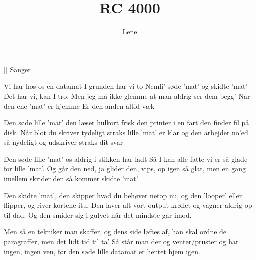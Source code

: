 \documentclass[a4paper,11pt]{article}
\title{RC 4000}
\author{Lene}
\begin{document}
\maketitle

\begin{roles}
[] Sanger
\end{roles}

\begin{song}
Vi har hos os en datamat
I grunden har vi to
Nemli' søde 'mat' og skidte 'mat'
Det har vi, kan I tro.
Men jeg må ikke glemme
at man aldrig ser dem begg'
Når den ene 'mat' er hjemme
Er den anden altid væk

Den søde lille 'mat'
den læser hulkort frisk
den printer i en fart
den finder fil på disk.
Når blot du skriver tydeligt
straks lille 'mat' er klar
og den arbejder no'ed så nydeligt
og udskriver straks dit svar

Den søde lille 'mat'
os aldrig i stikken har ladt
Så I kan alle fatte
vi er så glade for lille 'mat'.
Og går den ned, ja glider den,
vips, op igen så glat,
men en gang imellem skrider den
så kommer skidte 'mat'

Den skidte 'mat', den skipper
hvad du behøver netop nu,
og den 'looper' eller flipper,
og river kortene itu.
Den laver alt vort output krøllet
og vågner aldrig op til dåd.
Og den smider sig i gulvet
når det mindste går imod.

Men så en tekniker man skaffer,
og dens side løftes af,
han skal ordne de paragraffer,
men det lidt tid til ta'
Så står man der og venter/pruster
og har ingen, ingen ven,
før den søde lille datamat
er hentet hjem igen.
\end{song}
\end{document}
